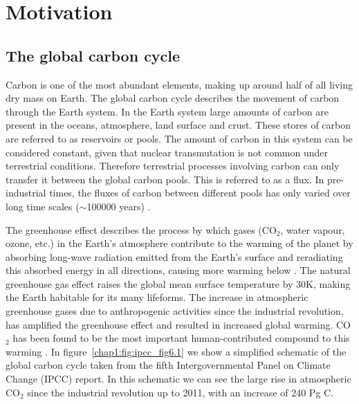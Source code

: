 
\section{Motivation}

\subsection{The global carbon cycle} \label{chap1:sec:global_c_cycle}

Carbon is one of the most abundant elements, making up around half of all living dry mass on Earth. The global carbon cycle describes the movement of carbon through the Earth system. In the Earth system large amounts of carbon are present in the oceans, atmosphere, land surface and crust. These stores of carbon are referred to as reservoirs or pools. The amount of carbon in this system can be considered constant, given that nuclear transmutation is not common under terrestrial conditions. Therefore terrestrial processes involving carbon can only transfer it between the global carbon pools. This is referred to as a flux. In pre-industrial times, the fluxes of carbon between different pools has only varied over long time scales (\(\sim\)100000 years) \citep{luthi2008high}.

The greenhouse effect describes the process by which gases (CO\(_{2}\), water vapour, ozone, etc.) in the Earth's atmosphere contribute to the warming of the planet by absorbing long-wave radiation emitted from the Earth's surface and reradiating this absorbed energy in all directions, causing more warming below \citep{mitchell1989greenhouse}. The natural greenhouse gas effect raises the global mean surface temperature by 30K, making the Earth habitable for its many lifeforms. The increase in atmospheric greenhouse gases due to anthropogenic activities since the industrial revolution, has amplified the greenhouse effect and resulted in increased global warming. CO\(_{2}\) has been found to be the most important human-contributed compound to this warming \citep{Falkowski291}. In figure~\ref{chap1:fig:ipcc_fig6.1} we show a simplified schematic of the global carbon cycle taken from the fifth Intergovernmental Panel on Climate Change (IPCC) report. In this schematic we can see the large rise in atmospheric CO\(_{2}\) since the industrial revolution up to 2011, with an increase of 240 Pg C.

